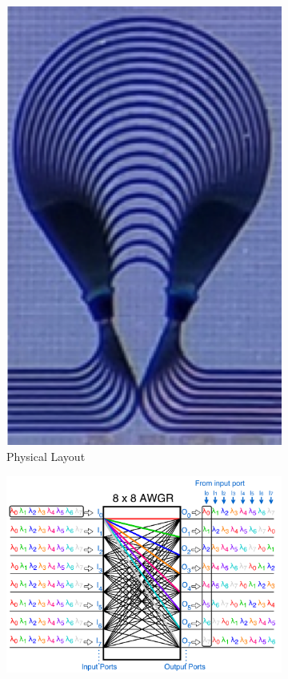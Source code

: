 \begin{figure}[t!]
    \centering
        \begin{subfigure}[t]{0.18\linewidth}
        \includegraphics[width=\textwidth, clip]{Figures/awgrlayout.png}
        \caption{Physical Layout}
        		\label{fig:awgrlayout}
       \end{subfigure}
        \hspace{0.4cm}
        \begin{subfigure}[t]{0.46\linewidth}
        \includegraphics[width=\textwidth, clip]{Figures/awgr.pdf}

\end{subfigure}
\end{figure}
